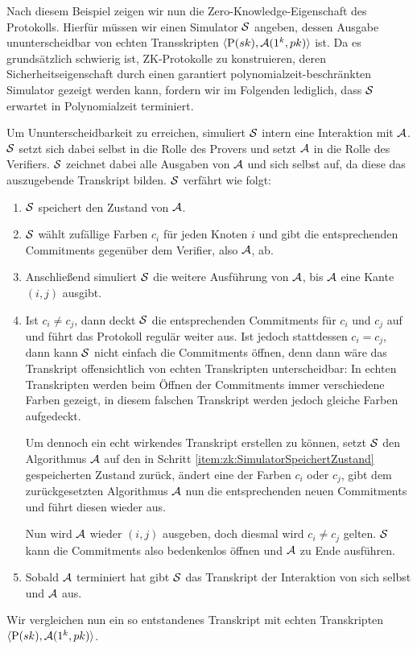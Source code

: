 Nach diesem Beispiel zeigen wir nun die Zero-Knowledge-Eigenschaft des
Protokolls.  Hierfür müssen wir einen Simulator $\mathcal{S}$ angeben, dessen
Ausgabe ununterscheidbar von echten Transskripten $\langle
\mathrm{P}(sk), \mathcal{A}(1^k, pk) \rangle$ ist.  Da es grundsätzlich
schwierig ist, ZK-Protokolle zu konstruieren, deren
Sicherheitseigenschaft durch einen garantiert
poly\-nomialzeit-be\-schränk\-ten Simulator gezeigt werden kann, fordern
wir im Folgenden lediglich, dass $\mathcal{S}$ erwartet in Polynomialzeit
terminiert.

Um Ununterscheidbarkeit zu erreichen, simuliert $\mathcal{S}$ intern eine
Interaktion mit $\mathcal{A}$. $\mathcal{S}$ setzt sich dabei selbst in die Rolle des
Provers und setzt $\mathcal{A}$ in die Rolle des Verifiers. $\mathcal{S}$ zeichnet dabei
alle Ausgaben von $\mathcal{A}$ und sich selbst auf, da diese das auszugebende
Transkript bilden.  $\mathcal{S}$ verfährt wie folgt:
\begin{enumerate}
\item \label{item:zk:SimulatorSpeichertZustand}
  $\mathcal{S}$ speichert den Zustand von $\mathcal{A}$.
\item $\mathcal{S}$ wählt zufällige Farben $c_i$ für jeden Knoten $i$ und gibt
  die entsprechenden Commitments gegenüber dem Verifier, also $\mathcal{A}$, ab. 
\item Anschließend simuliert $\mathcal{S}$ die weitere Ausführung von $\mathcal{A}$, bis
  $\mathcal{A}$ eine Kante $(i,j)$ ausgibt.
\item Ist $c_i \neq c_j$, dann deckt $\mathcal{S}$ die entsprechenden
  Commitments für $c_i$ und $c_j$ auf und führt das Protokoll regulär
  weiter aus. Ist jedoch stattdessen $c_i = c_j$, dann kann $\mathcal{S}$ nicht
  einfach die Commitments öffnen, denn dann wäre das Transkript
  offensichtlich von echten Transkripten unterscheidbar: In echten
  Transkripten werden beim Öffnen der Commitments immer verschiedene
  Farben gezeigt, in diesem falschen Transkript werden jedoch gleiche
  Farben aufgedeckt. 
  
  Um dennoch ein echt wirkendes Transkript erstellen zu können, setzt
  $\mathcal{S}$ den Algorithmus $\mathcal{A}$ auf den in Schritt
  \ref{item:zk:SimulatorSpeichertZustand} gespeicherten Zustand zurück,
  ändert eine der Farben $c_i$ oder $c_j$, gibt dem zurückgesetzten
  Algorithmus $\mathcal{A}$ nun die entsprechenden neuen Commitments und führt
  diesen wieder aus.
  
  Nun wird $\mathcal{A}$ wieder $(i,j)$ ausgeben, doch diesmal wird $c_i \neq
  c_j$ gelten. $\mathcal{S}$ kann die Commitments also bedenkenlos öffnen und
  $\mathcal{A}$ zu Ende ausführen.

\item Sobald $\mathcal{A}$ terminiert hat gibt $\mathcal{S}$ das Transkript der
  Interaktion von sich selbst und $\mathcal{A}$ aus. 
\end{enumerate}
Wir vergleichen nun ein so entstandenes Transkript mit echten
Transkripten $\langle \mathrm{P}(sk), \mathcal{A}(1^k, pk) \rangle$.

